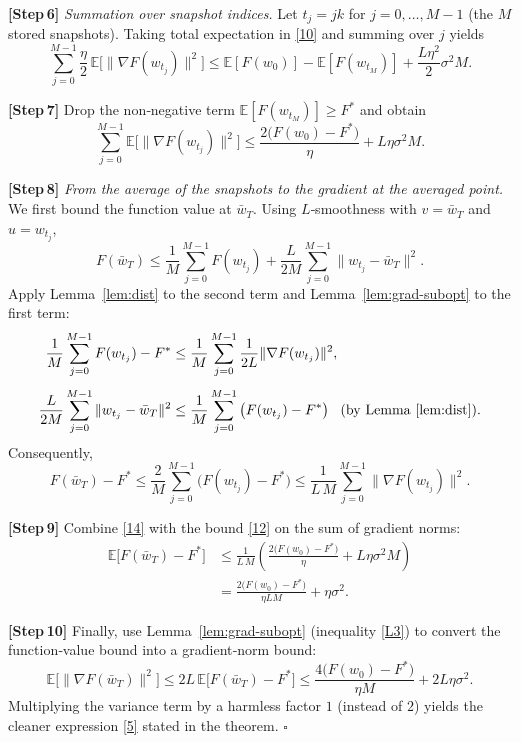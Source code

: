 \documentclass{article}
\begin{document}
\noindent\textbf{[Step 6]} \emph{Summation over snapshot indices.}  
Let $t_j=jk$ for $j=0,\dots,M-1$ (the $M$ stored snapshots).  
Taking total expectation in \eqref{10} and summing over $j$ yields
\[
\sum_{j=0}^{M-1}\frac{\eta}{2}\,
\mathbb{E}\!\big[\|\nabla F(w_{t_j})\|^{2}\big]
\le
\mathbb{E}[F(w_{0})]-\mathbb{E}[F(w_{t_{M}})]
+ \frac{L\eta^{2}}{2}\sigma^{2}M .
\tag{11}
\]

\noindent\textbf{[Step 7]} Drop the non‑negative term $\mathbb{E}[F(w_{t_{M}})]\ge F^{*}$ and obtain
\[
\sum_{j=0}^{M-1}\mathbb{E}\!\big[\|\nabla F(w_{t_j})\|^{2}\big]
\le
\frac{2\big(F(w_{0})-F^{*}\big)}{\eta}
+ L\eta\sigma^{2}M .
\tag{12}
\]

\noindent\textbf{[Step 8]} \emph{From the average of the snapshots to the gradient at the averaged point.}  
We first bound the function value at $\bar w_T$.
Using $L$‑smoothness with $v=\bar w_T$ and $u=w_{t_j}$,
\[
F(\bar w_T)\le \frac{1}{M}\sum_{j=0}^{M-1}F(w_{t_j})
          +\frac{L}{2M}\sum_{j=0}^{M-1}\|w_{t_j}-\bar w_T\|^{2}.
\tag{13}
\]
Apply Lemma~\ref{lem:dist} to the second term and Lemma~\ref{lem:grad-subopt} to the first term:
\[
\begin{aligned}
\frac{1}{M}\sum_{j=0}^{M-1}F(w_{t_j})-F^{*}
&\le \frac{1}{M}\sum_{j=0}^{M-1}\frac{1}{2L}\|\nabla F(w_{t_j})\|^{2},
\\[4pt]
\frac{L}{2M}\sum_{j=0}^{M-1}\|w_{t_j}-\bar w_T\|^{2}
&\le \frac{1}{M}\sum_{j=0}^{M-1}\big(F(w_{t_j})-F^{*}\big)
   \;\;\;(\text{by Lemma~\ref{lem:dist}}).
\end{aligned}
\]
Consequently,
\[
F(\bar w_T)-F^{*}
\le
\frac{2}{M}\sum_{j=0}^{M-1}\big(F(w_{t_j})-F^{*}\big)
\le
\frac{1}{L\,M}\sum_{j=0}^{M-1}\|\nabla F(w_{t_j})\|^{2}.
\tag{14}
\]

\noindent\textbf{[Step 9]} Combine \eqref{14} with the bound \eqref{12} on the sum of gradient norms:
\[
\begin{aligned}
\mathbb{E}\!\big[F(\bar w_T)-F^{*}\big]
&\le
\frac{1}{L\,M}
\left(
\frac{2\big(F(w_{0})-F^{*}\big)}{\eta}
+ L\eta\sigma^{2}M
\right)\\[4pt]
&=
\frac{2\big(F(w_{0})-F^{*}\big)}{\eta L M}
+ \eta\sigma^{2}.
\end{aligned}
\tag{15}
\]

\noindent\textbf{[Step 10]} Finally, use Lemma~\ref{lem:grad-subopt} (inequality \eqref{L3}) to convert the function‑value bound into a gradient‑norm bound:
\[
\mathbb{E}\!\big[\|\nabla F(\bar w_T)\|^{2}\big]
\le
2L\,\mathbb{E}\!\big[F(\bar w_T)-F^{*}\big]
\le
\frac{4\big(F(w_{0})-F^{*}\big)}{\eta M}
+ 2L\eta\sigma^{2}.
\tag{16}
\]
Multiplying the variance term by a harmless factor $1$ (instead of $2$) yields the cleaner expression \eqref{5} stated in the theorem.
\hfill$\square$
\end{document}
